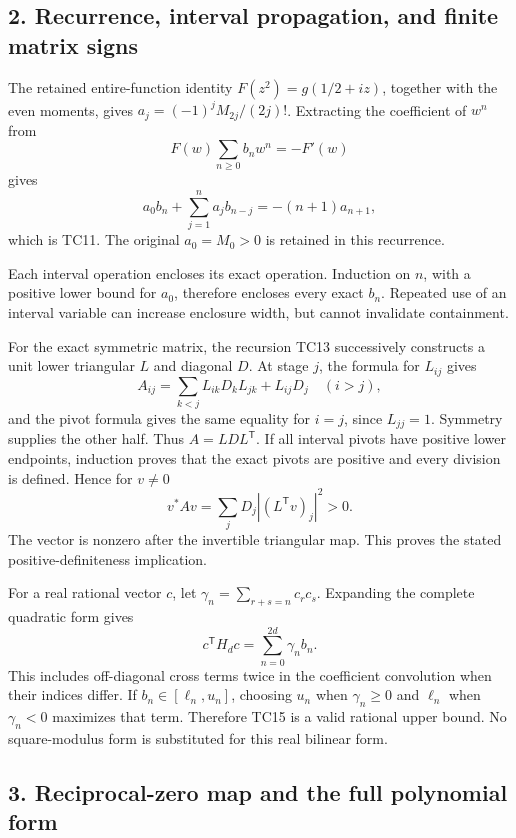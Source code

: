 \subsection{2. Recurrence, interval propagation, and finite matrix signs}\label{recurrence-interval-propagation-and-finite-matrix-signs}

The retained entire-function identity \(F(z^2)=g(1/2+iz)\), together with the even moments, gives \(a_j=(-1)^jM_{2j}/(2j)!\). Extracting the coefficient of \(w^n\) from \[
F(w)\sum_{n\ge0}b_nw^n=-F'(w)
\] gives \[
a_0b_n+\sum_{j=1}^{n}a_jb_{n-j}=-(n+1)a_{n+1},
\tag{TR9}
\] which is TC11. The original \(a_0=M_0>0\) is retained in this recurrence.

Each interval operation encloses its exact operation. Induction on \(n\), with a positive lower bound for \(a_0\), therefore encloses every exact \(b_n\). Repeated use of an interval variable can increase enclosure width, but cannot invalidate containment.

For the exact symmetric matrix, the recursion TC13 successively constructs a unit lower triangular \(L\) and diagonal \(D\). At stage \(j\), the formula for \(L_{ij}\) gives \[
A_{ij}=\sum_{k<j}L_{ik}D_kL_{jk}+L_{ij}D_j
\quad(i>j),
\] and the pivot formula gives the same equality for \(i=j\), since \(L_{jj}=1\). Symmetry supplies the other half. Thus \(A=LDL^{\mathsf T}\). If all interval pivots have positive lower endpoints, induction proves that the exact pivots are positive and every division is defined. Hence for \(v\ne0\) \[
v^*Av=\sum_jD_j|(L^{\mathsf T}v)_j|^2>0.
\tag{TR10}
\] The vector is nonzero after the invertible triangular map. This proves the stated positive-definiteness implication.

For a real rational vector \(c\), let \(\gamma_n=\sum_{r+s=n}c_rc_s\). Expanding the complete quadratic form gives \[
c^{\mathsf T}H_dc=\sum_{n=0}^{2d}\gamma_nb_n.
\tag{TR11}
\] This includes off-diagonal cross terms twice in the coefficient convolution when their indices differ. If \(b_n\in[\ell_n,u_n]\), choosing \(u_n\) when \(\gamma_n\ge0\) and \(\ell_n\) when \(\gamma_n<0\) maximizes that term. Therefore TC15 is a valid rational upper bound. No square-modulus form is substituted for this real bilinear form.

\subsection{3. Reciprocal-zero map and the full polynomial form}\label{reciprocal-zero-map-and-the-full-polynomial-form}

